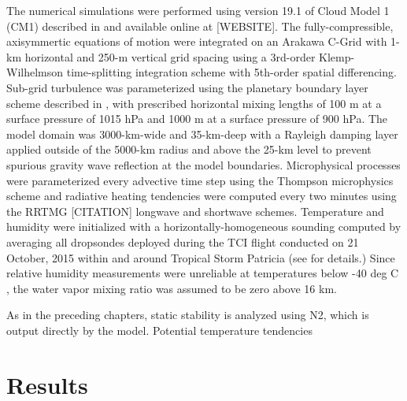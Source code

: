 The numerical simulations were performed using version 19.1 of Cloud Model 1 (CM1) described in \cite{BryanRotunno2009} and available online at [WEBSITE].
The fully-compressible, axisymmertic equations of motion were integrated on an Arakawa C-Grid with 1-km horizontal and 250-m vertical grid spacing using a 3rd-order Klemp-Wilhelmson time-splitting integration scheme with 5th-order spatial differencing.
Sub-grid turbulence was parameterized using the planetary boundary layer scheme described in \cite{BryanRotunno2009}, with prescribed horizontal mixing lengths of 100 m at a surface pressure of 1015 hPa and 1000 m at a surface pressure of 900 hPa. 
The model domain was 3000-km-wide and 35-km-deep with a Rayleigh damping layer applied outside of the 5000-km radius and above the 25-km level to prevent spurious gravity wave reflection at the model boundaries.
Microphysical processes were parameterized every advective time step using the Thompson microphysics scheme \cite{Thompson} and radiative heating tendencies were computed every two minutes using the RRTMG [CITATION] longwave and shortwave schemes. 
Temperature and humidity were initialized with a horizontally-homogeneous sounding computed by averaging all dropsondes deployed during the TCI flight conducted on 21 October, 2015 within and around Tropical Storm Patricia (see \cite{DoyleTCI} for details.)
Since relative humidity measurements were unreliable at temperatures below -40 deg C \cite{BellTCI}, the water vapor mixing ratio was assumed to be zero above 16 km.

 
As in the preceding chapters, static stability is analyzed using N2, which is output directly by the model. Potential temperature tendencies 

\section{Results}


